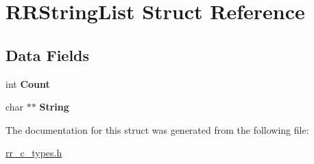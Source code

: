 \hypertarget{struct_r_r_string_list}{
\section{\-R\-R\-String\-List \-Struct \-Reference}
\label{struct_r_r_string_list}
}
\subsection*{\-Data \-Fields}
\begin{DoxyCompactItemize}
\item 
\hypertarget{struct_r_r_string_list_aad462966ed963f892117056de1eba502}{
int {\bfseries \-Count}}
\label{struct_r_r_string_list_aad462966ed963f892117056de1eba502}

\item 
\hypertarget{struct_r_r_string_list_acdbc34377baf3e52d9044aada0f2f511}{
char $\ast$$\ast$ {\bfseries \-String}}
\label{struct_r_r_string_list_acdbc34377baf3e52d9044aada0f2f511}

\end{DoxyCompactItemize}


\-The documentation for this struct was generated from the following file\-:\begin{DoxyCompactItemize}
\item 
\hyperlink{rr__c__types_8h}{rr\-\_\-c\-\_\-types.\-h}\end{DoxyCompactItemize}
